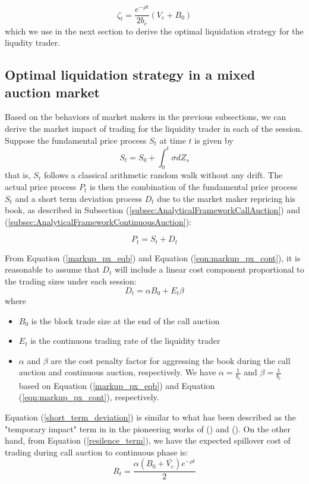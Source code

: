 \documentclass{article}
\begin{document}
\begin{equation}\label{resilence_term}
  \zeta_t = \frac{e^{-\rho t}}{2 b_e}  (V_e + B_0)
\end{equation}
which we use in the next section to derive the optimal liquidation strategy for the liqudity trader.

\subsection{Optimal liquidation strategy in a mixed auction market}

Based on the behaviors of market makers in the previous subsections, we can derive the market impact of trading for the liquidity trader in each of the session. Suppose the fundamental price process $S_t$ at time $t$ is given by
\[
  S_t = S_0 + \int_0^t \sigma dZ_s
\]
that is, $S_t$ follows a classical arithmetic random walk without any drift. The actual price process $P_t$ is then the combination of the fundamental price process $S_t$ and a short term deviation process $D_t$ due to the market maker repricing his book, as described in Subsection (\ref{subsec:AnalyticalFrameworkCallAuction}) and (\ref{subsec:AnalyticalFrameworkContinuousAuction}):

\[
  P_t = S_t + D_t
\]

From Equation (\ref{markup_px_eqb}) and Equation (\ref{eqn:markup_px_cont}), it is reasonable to assume that $D_t$ will include a linear cost component proportional to the trading sizes under each session:
\begin{equation}\label{short_term_deviation}
  D_t = \alpha B_0 + E_t \beta
\end{equation}
where
\begin{itemize}
  \item $B_0$ is the block trade size at the end of the call auction
  \item $E_t$ is the continuous trading rate of the liquidity trader
  \item $\alpha$ and $\beta$ are the cost penalty factor for aggressing the book during the call auction and continuous auction, respectively. We have $\alpha=\frac{1}{b_e}$ and $\beta=\frac{1}{b_c}$ based on Equation (\ref{markup_px_eqb}) and Equation (\ref{eqn:markup_px_cont}), respectively.
\end{itemize}
Equation (\ref{short_term_deviation}) is similar to what has been described as the "temporary impact" term in in the pioneering works of (\cite{BertimasLo1999}) and (\cite{AlmgrenChriss2000}). On the other hand, from Equation (\ref{resilence_term}), we have the expected spillover cost of trading during call auction to continuous phase is:
\[
  R_t = \frac{\alpha (B_0 + \bar{V_e}) e^{-\rho t}}{2}
\]
\end{document}
